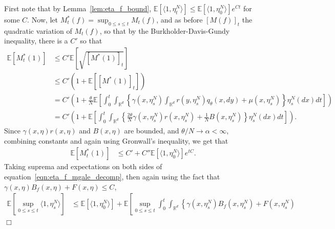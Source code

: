 \documentclass[12pt]{article}
\newenvironment {proof}{{\noindent\bf Proof }}{\hfill $\Box$ \medskip}
\newcommand{\IE}{\mathbb E}
\newcommand{\IR}{\mathbb R}
\begin{document}
\begin{proof}
    First note that by Lemma~\ref{lem:eta_f_bound},
    $\IE[\langle 1, \eta^N_t \rangle] \le \IE[\langle 1, \eta^N_0 \rangle] e^{Ct}$
    for some $C$.
    Now, let $M^*_t(f) = \sup_{0 \le s \le t} M_t(f)$,
    and as before $[M(f)]_t$ the quadratic variation of $M_t(f)$,
    so that by the Burkholder-Davis-Gundy inequality, there is a $C'$ so that
    \begin{align*}
        \IE\left[ M^*_t(1) \right]
        &\le
        C' \IE\left[ \sqrt{[M^*(1)]_t} \right]
        \\ &\le
        C'\left( 1 + \IE\left[ [M^*(1)]_t \right] \right)
        \\ &=
        C'\left( 1 + \frac{\theta}{N} \IE\left[
            \int_0^t
            \int_{\IR^d} \left\{
                \gamma(x, \eta^N_s)
                \int_{\IR^d} r(y, \eta^N_s) q_\theta(x, dy)
                + \mu(x, \eta^N_s)
            \right\} \eta_s^N(dx)
            dt
            \right] \right)
        \\ &=
        C'\left( 1 + \IE\left[
            \int_0^t
            \int_{\IR^d} \left\{
                \frac{2\theta}{N} \gamma(x, \eta^N_s) r(x, \eta^N_s)
                + \frac{1}{N} B(x, \eta^N_s)
            \right\} \eta_s^N(dx)
            dt
            \right] \right) .
    \end{align*}
    Since $\gamma(x, \eta) r(x, \eta)$ and $B(x, \eta)$ are bounded,
    and $\theta/N \to \alpha < \infty$,
    combining constants and again using Gronwall's inequality, we get that
    \begin{align*}
        \IE\left[ M^*_t(1) \right]
        &\le
        C' + C'' \IE[ \langle 1, \eta_0^N \rangle ] e^{tC} .
    \end{align*}
    Taking suprema and expectations on both sides of equation~\eqref{eqn:eta_f_mgale_decomp},
    then again using the fact that $\gamma(x, \eta) B_f(x, \eta) + F(x, \eta) \le C$,
    \begin{align*}
        \IE\left[\sup_{0 \le s \le t} \langle 1, \eta^N_s \rangle \right]
        &\le
        \IE[\langle 1, \eta^N_0 \rangle]
        + \IE\left[
            \sup_{0 \le s \le t}
            \int_0^t \int_{\IR^d} \left\{
                \gamma(x, \eta^N_s)
                B_f(x, \eta^N_s)
                + F(x, \eta^N_s)

\end{align*}
\end{proof}
\end{document}
